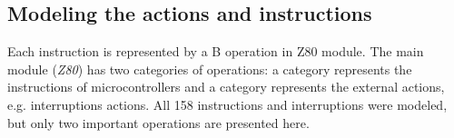 \documentclass[a4paper]{llncs}
\begin{document}
%

\subsection{Modeling the actions and instructions}
Each instruction is represented by a B operation in Z80 module. The
main module (\textit{Z80}) has two categories of operations: a
category represents the instructions of microcontrollers and a
category represents the external actions, e.g.  interruptions
actions. All 158 instructions and interruptions were modeled, but only
two important operations are presented here.
\end{document}
